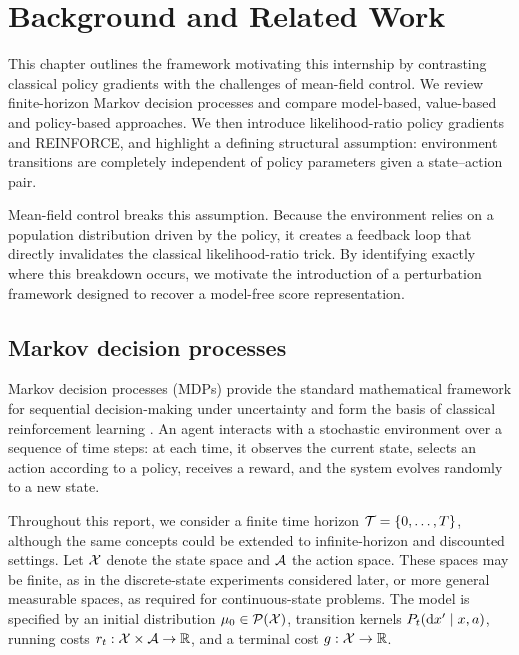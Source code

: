 \chapter{Background and Related Work}
\label{chapter:background}

This chapter outlines the framework motivating this internship by contrasting classical policy gradients with the challenges of mean-field control. We review finite-horizon Markov decision processes and compare model-based, value-based and policy-based approaches. We then introduce likelihood-ratio policy gradients and REINFORCE, and highlight a defining structural assumption: environment transitions are completely independent of policy parameters given a state--action pair.

Mean-field control breaks this assumption. Because the environment relies on a population distribution driven by the policy, it creates a feedback loop that directly invalidates the classical likelihood-ratio trick. By identifying exactly where this breakdown occurs, we motivate the introduction of a perturbation framework designed to recover a model-free score representation.

\section{Markov decision processes}
\label{sec:background-mdp}

Markov decision processes (MDPs) provide the standard mathematical framework for sequential decision-making under uncertainty and form the basis of classical reinforcement learning \cite{puterman1994mdp, sutton2018reinforcement}. An agent interacts with a stochastic environment over a sequence of time steps: at each time, it observes the current state, selects an action according to a policy, receives a reward, and the system evolves randomly to a new state.

Throughout this report, we consider a finite time horizon ${\cal T} = \{0,\ldots,T\}$, although the same concepts could be extended to infinite-horizon and discounted settings. Let ${\cal X}$ denote the state space and ${\cal A}$ the action space. These spaces may be finite, as in the discrete-state experiments considered later, or more general measurable spaces, as required for continuous-state problems. The model is specified by an initial distribution $\mu_0\in{\cal P}({\cal X})$, transition kernels $P_t(\mathrm{d} x'\mid x,a)$, running costs $r_t:{\cal X}\times{\cal A}\to\mathbb{R}$, and a terminal cost $g:{\cal X}\to\mathbb{R}$.

